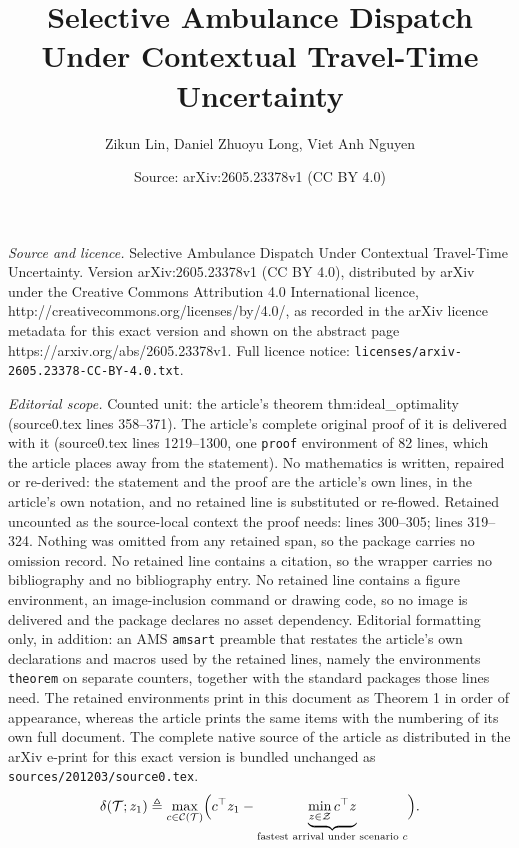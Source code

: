 \documentclass[10pt,a4paper]{amsart}
\title{Selective Ambulance Dispatch Under Contextual Travel-Time Uncertainty}
\author{Zikun Lin, Daniel Zhuoyu Long, Viet Anh Nguyen}
\date{Source: arXiv:2605.23378v1 (CC BY 4.0)}
\newcommand{\Let}{\triangleq}
\begin{document}
\maketitle

\noindent\emph{Source and licence.} Selective Ambulance Dispatch Under Contextual Travel-Time Uncertainty. Version arXiv:2605.23378v1 (CC BY 4.0), distributed by arXiv under the Creative Commons Attribution 4.0 International licence, http://creativecommons.org/licenses/by/4.0/, as recorded in the arXiv licence metadata for this exact version and shown on the abstract page https://arxiv.org/abs/2605.23378v1. Full licence notice: \texttt{licenses/arxiv-2605.23378-CC-BY-4.0.txt}.\par\smallskip

\noindent\textit{Editorial scope.} Counted unit: the article's theorem thm:ideal\_optimality (source0.tex lines 358--371). The article's complete original proof of it is delivered with it (source0.tex lines 1219--1300, one \texttt{proof} environment of 82 lines, which the article places away from the statement). No mathematics is written, repaired or re-derived: the statement and the proof are the article's own lines, in the article's own notation, and no retained line is substituted or re-flowed.  Retained uncounted as the source-local context the proof needs: lines 300--305; lines 319--324.  Nothing was omitted from any retained span, so the package carries no omission record.  No retained line contains a citation, so the wrapper carries no bibliography and no bibliography entry.  No retained line contains a figure environment, an image-inclusion command or drawing code, so no image is delivered and the package declares no asset dependency.  Editorial formatting only, in addition: an AMS \texttt{amsart} preamble that restates the article's own declarations and macros used by the retained lines, namely the environments \texttt{theorem} on separate counters, together with the standard packages those lines need.  The retained environments print in this document as Theorem 1 in order of appearance, whereas the article prints the same items with the numbering of its own full document.  The complete native source of the article as distributed in the arXiv e-print for this exact version is bundled unchanged as \texttt{sources/201203/source0.tex}.
\begin{equation}
\label{eq:delta-rho}
\delta(\mathcal T; z_1) \Let
\max_{c\in\mathcal C(\mathcal T)}
\Bigl( c^\top z_1  -  \underbrace{\min_{z \in\mathcal Z} c^\top z}_{\text{fastest arrival under scenario } c} \Bigr).
\end{equation}
\end{document}
